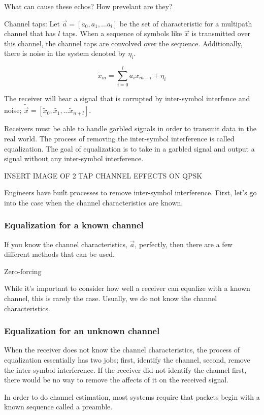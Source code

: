 What can cause these echos?  How prevelant are they?

Channel taps:
Let $\vec{a} = [a_0, a_1, \ldots a_l]$ be the set of characteristic for a multipath channel that has $l$ taps. When a sequence of symbols like $\vec{x}$ is transmitted over this channel, the channel taps are convolved over the sequence.  Additionally, there is noise in the system denoted by $\eta_i$. 

$$\tilde{x}_m = \sum_{i=0}^l a_i x_{m-i} + \eta_i$$

The receiver will hear a signal that is corrupted by inter-symbol interfence and noise;
$\tilde{\vec{x}}=[\tilde{x}_0, \tilde{x_1}, \ldots \tilde{x}_{n+l}]$. 

Receivers must be able to handle garbled signals in order to transmit data in the real world.  The process of removing the inter-symbol interference is called equalization.  The goal of equalization is to take in a garbled signal and output a signal without any inter-symbol interference. 

INSERT IMAGE OF 2 TAP CHANNEL EFFECTS ON QPSK

Engineers have built processes to remove inter-symbol interference.  First, let's go into the case when the channel characteristics are known.

\subsubsection{Equalization for a known channel}
If you know the channel characteristics, $\vec{a}$, perfectly, then there are a few different methods that can be used. 

Zero-forcing

While it's important to consider how well a receiver can equalize with a known channel, this is rarely the case.  Usually, we do not know the channel characteristics.

\subsubsection{Equalization for an unknown channel}
When the receiver does not know the channel characteristics, the process of equalization essentially has two jobs; first, identify the channel, second, remove the inter-symbol interference. If the receiver did not identify the channel first, there would be no way to remove the affects of it on the received signal. 

In order to do channel estimation, most systems require that packets begin with a known sequence called a preamble. 

